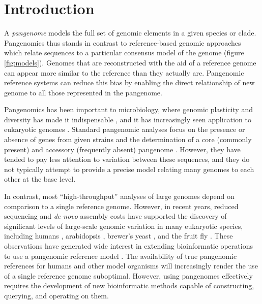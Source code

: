 \section{Introduction}  
\label{sec:intro}

A \emph{pangenome} models the full set of genomic elements in a given species or clade.
Pangenomics thus stands in contrast to reference-based genomic approaches which relate sequences to a particular consensus model of the genome (figure \ref{fig:models}).
Genomes that are reconstructed with the aid of a reference genome can appear more similar to the reference than they actually are.
Pangenomic reference systems can reduce this bias by enabling the direct relationship of new genome to all those represented in the pangenome.

Pangenomics has been important to microbiology, where genomic plasticity and diversity has made it indispensable \cite{Vernikos2015}, and it has increasingly seen application to eukaryotic genomes \cite{cao2011whole,gao2019tomato,Ou_2018}.
Standard pangenomic analyses focus on the presence or absence of genes from given strains and the determination of a core (commonly present) and accessory (frequently absent) pangenome \cite{page2015roary}.
However, they have tended to pay less attention to variation between these sequences, and they do not typically attempt to provide a precise model relating many genomes to each other at the base level.

In contrast, most ``high-throughput'' analyses of large genomes depend on comparison to a single reference genome.
However, in recent years, reduced sequencing and \emph{de novo} assembly costs have supported the discovery of significant levels of large-scale genomic variation in many eukaryotic species, including humans \cite{sudmant2015integrated,Hehir-Kwa2016-hb,chaisson2018multi,Audano_2019}, arabidopsis \cite{alonso2016arabidopsis}, brewer's yeast \cite{yue2017contrasting}, and the fruit fly \cite{chakraborty2018hidden}.
These observations have generated wide interest in extending bioinformatic operations to use a pangenomic reference model \cite{computational2016computational}.
The availability of true pangenomic references for humans \cite{Church2015-vt} and other model organisms will increasingly render the use of a single reference genome suboptimal.
However, using pangenomes effectively requires the development of new bioinformatic methods capable of constructing, querying, and operating on them.

